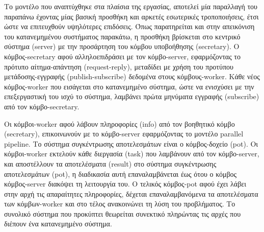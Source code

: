   

Το μοντέλο που αναπτύχθηκε στα πλαίσια της εργασίας, αποτελεί μία παραλλαγή του παραπάνω έχοντας μίας βασική προσθήκη και αρκετές εσωτερικές τροποποιήσεις, έτσι ώστε να επιτευχθούν υψηλότερες επιδόσεις. Όπως παρατηρείται και στην απεικόνιση του κατανεμημένου συστήματος παρακάτω, η προσθήκη βρίσκεται στο κεντρικό σύστημα (server) με την προσάρτηση του κόμβου υποβοήθησης (secretary). Ο κόμβος-secretary αφού αλληλοεπιδράσει με τον κόμβο-server, εφαρμόζοντας το πρότυπο αίτημα-απάντηση (request-reply), μεταδίδει με χρήση του προτύπου μετάδοσης-εγγραφής (publish-subscribe) δεδομένα στους κόμβους-worker. Κάθε νέος κόμβος-worker που εισάγεται στο κατανεμημένο σύστημα, ώστε να ενισχύσει με την επεξεργαστική του ισχύ το σύστημα, λαμβάνει πρώτα μηνύματα εγγραφής (subscribe) από τον κόμβο-secretary. 

Οι κόμβοι-worker αφού λάβουν πληροφορίες (info) από τον βοηθητικό κόμβο (secretary), επικοινωνούν με το κόμβο-server εφαρμόζοντας το μοντέλο parallel pipeline. Το σύστημα συγκέντρωσης αποτελεσμάτων είναι ο κόμβος-δοχείο (pot). Οι κόμβοι-worker εκτελούν κάθε διεργασία (task) που λαμβάνουν από τον κόμβο-server, και αποστέλλουν τα αποτελέσματα (result) στο σύστημα συγκέντρωσης αποτελεσμάτων (pot), η διαδικασία αυτή επαναλαμβάνεται έως ότου ο κόμβος κόμβος-server διακόψει τη λειτουργία του. O τελικός κόμβος-pot αφού έχει λάβει στην αρχή τις απαραίτητες πληροφορίες, δέχεται επαναλαμβανόμενα τα αποτελέσματα των κόμβων-worker και στο τέλος ανακοινώνει τη λύση του προβλήματος. Το συνολικό σύστημα που προκύπτει θεωρείται συνεκτικό πληρώντας τις αρχές που διέπουν ένα κατανεμημένο σύστημα. 

